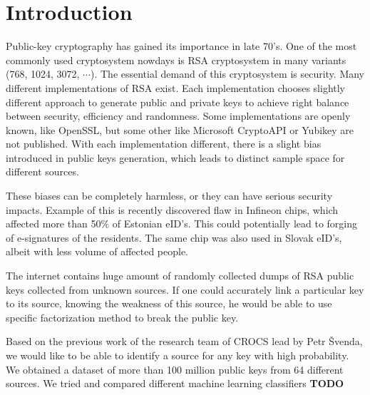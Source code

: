 \chapter*{Introduction}

Public-key cryptography has gained its importance in late 70's. One of the most commonly used cryptosystem nowdays is RSA cryptosystem in many variants (768, 1024, 3072, $\cdots$). The essential demand of this cryptosystem is security. Many different implementations of RSA exist. Each implementation chooses slightly different approach to generate public and private keys to achieve right balance between security, efficiency and randomness. Some implementations are openly known, like OpenSSL, but some other like Microsoft CryptoAPI or Yubikey are not published. With each implementation different, there is a slight bias introduced in public keys generation, which leads to distinct sample space for different sources. 

These biases can be completely harmless, or they can have serious security impacts. Example of this is recently discovered flaw in Infineon chips\cite{svenda_3}, which affected more than 50\% of Estonian eID's. This could potentially lead to forging of e-signatures of the residents. The same chip was also used in Slovak eID's, albeit with less volume of affected people.

The internet contains huge amount of randomly collected dumps of RSA public keys collected from unknown sources. If one could accurately link a particular key to its source, knowing the weakness of this source, he would be able to use specific factorization method to break the public key.

Based on the previous work\cite{svenda_1}\cite{svenda_2} of the research team of CROCS lead by Petr Švenda, we would like to be able to identify a source for any key with high probability. We obtained a dataset of more than 100 million public keys from 64 different sources. We tried and compared different machine learning classifiers \textbf{TODO}
